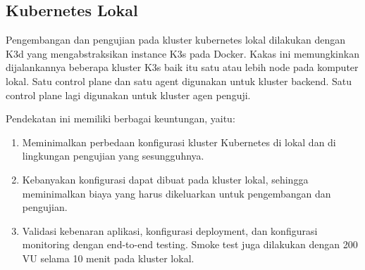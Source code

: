 \subsection{Kubernetes Lokal}

Pengembangan dan pengujian pada kluster kubernetes lokal dilakukan dengan K3d yang mengabstraksikan instance K3s pada Docker. Kakas ini memungkinkan dijalankannya beberapa kluster K3s baik itu satu atau lebih node pada komputer lokal. Satu control plane dan satu agent digunakan untuk kluster backend. Satu control plane lagi digunakan untuk kluster agen penguji.

Pendekatan ini memiliki berbagai keuntungan, yaitu:

\begin{enumerate}
    \item Meminimalkan perbedaan konfigurasi kluster Kubernetes di lokal dan di lingkungan pengujian yang sesungguhnya.
    \item Kebanyakan konfigurasi dapat dibuat pada kluster lokal, sehingga meminimalkan biaya yang harus dikeluarkan untuk pengembangan dan pengujian.
    \item Validasi kebenaran aplikasi, konfigurasi deployment, dan konfigurasi monitoring dengan end-to-end testing. Smoke test juga dilakukan dengan 200 VU selama 10 menit pada kluster lokal.
\end{enumerate}
